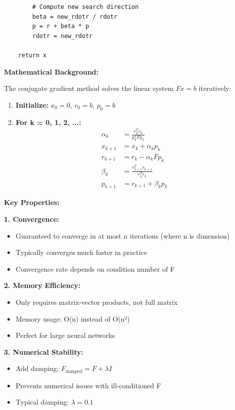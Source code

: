 \documentclass[12pt]{article}
\begin{document}
{{\begin{verbatim}
        # Compute new search direction
        beta = new_rdotr / rdotr
        p = r + beta * p
        rdotr = new_rdotr
    
    return x
\end{verbatim}

\textbf{Mathematical Background:}

The conjugate gradient method solves the linear system $Fx = b$ iteratively:

\begin{enumerate}
\item \textbf{Initialize:} $x_0 = 0$, $r_0 = b$, $p_0 = b$
\item \textbf{For k = 0, 1, 2, ...:}
\begin{align}
\alpha_k &= \frac{r_k^T r_k}{p_k^T F p_k} \\
x_{k+1} &= x_k + \alpha_k p_k \\
r_{k+1} &= r_k - \alpha_k F p_k \\
\beta_k &= \frac{r_{k+1}^T r_{k+1}}{r_k^T r_k} \\
p_{k+1} &= r_{k+1} + \beta_k p_k
\end{align}
\end{enumerate}

\textbf{Key Properties:}

\textbf{1. Convergence:}
\begin{itemize}
\item Guaranteed to converge in at most n iterations (where n is dimension)
\item Typically converges much faster in practice
\item Convergence rate depends on condition number of F
\end{itemize}

\textbf{2. Memory Efficiency:}
\begin{itemize}
\item Only requires matrix-vector products, not full matrix
\item Memory usage: O(n) instead of O(n²)
\item Perfect for large neural networks
\end{itemize}

\textbf{3. Numerical Stability:}
\begin{itemize}
\item Add damping: $F_{\text{damped}} = F + \lambda I$
\item Prevents numerical issues with ill-conditioned F
\item Typical damping: $\lambda = 0.1$
\end{itemize}

}}
\end{document}
